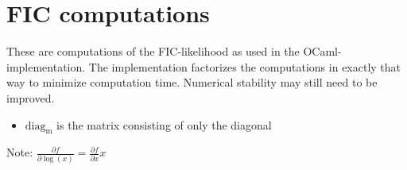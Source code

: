 \documentclass[12pt]{article}
\begin{document}
\section{FIC computations}

These are computations of the FIC-likelihood as used in the
OCaml-implementation.  The implementation factorizes the computations
in exactly that way to minimize computation time.  Numerical stability
may still need to be improved.

\begin{itemize}
\item $\mathrm{diag_m}$ is the matrix consisting of only the diagonal
\end{itemize}

Note: $\tfrac{\partial f}{\partial \log(x)} = \tfrac{\partial f}{\partial x} x$
\end{document}
